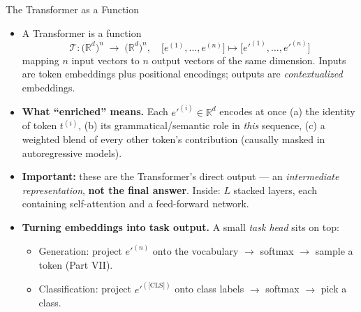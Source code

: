 \documentclass[10pt,english,aspectratio=169]{beamer}
\begin{document}
\begin{frame}{The Transformer as a Function}
\begin{itemize}
\item A Transformer is a function
\[
   \mathcal{T}\colon \bigl(\mathbb{R}^{d}\bigr)^{n} \;\longrightarrow\; \bigl(\mathbb{R}^{d}\bigr)^{n},
   \quad \bigl[e^{(1)}, \ldots, e^{(n)}\bigr] \mapsto \bigl[e'^{(1)}, \ldots, e'^{(n)}\bigr]
\]
mapping $n$ input vectors to $n$ output vectors of the same dimension. Inputs are token embeddings plus positional encodings; outputs are \emph{contextualized} embeddings.

\medskip
\item \textbf{What ``enriched'' means.} Each $e'^{(i)} \in \mathbb{R}^{d}$ encodes at once (a) the identity of token $t^{(i)}$, (b) its grammatical/semantic role in \emph{this} sequence, (c) a weighted blend of every other token's contribution (causally masked in autoregressive models).

\medskip
\item \textbf{Important:} these are the Transformer's direct output --- an \emph{intermediate representation}, \textbf{not the final answer}. Inside: $L$ stacked layers, each containing self-attention and a feed-forward network.

\medskip
\item \textbf{Turning embeddings into task output.} A small \emph{task head} sits on top:
\begin{itemize}
    \item Generation: project $e'^{(n)}$ onto the vocabulary $\to$ softmax $\to$ sample a token (Part VII).
    \item Classification: project $e'^{(\text{[CLS]})}$ onto class labels $\to$ softmax $\to$ pick a class.
\end{itemize}
\end{itemize}
\end{frame}
\end{document}

